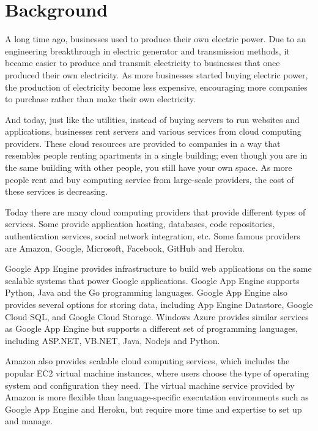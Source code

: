 
\section{Background}

A long time ago, businesses used to produce their own electric power.  Due to an engineering breakthrough in electric generator and transmission methods, it became easier to produce and transmit electricity to businesses that once produced their own electricity. As more businesses started buying electric power, the production of electricity become less expensive, encouraging more companies to purchase rather than make their own electricity.

And today, just like the utilities, instead of buying servers to run websites and applications, businesses rent servers and various services from cloud computing providers. These cloud resources are provided to companies in a way that resembles people renting apartments in a single building; even though you are in the same building with other people, you still have your own space. As more people rent and buy computing service from large-scale providers, the cost of these services is decreasing. 

Today there are many cloud computing providers that provide different types of services. Some provide application hosting, databases, code repositories, authentication services, social network integration, etc.  Some famous providers are Amazon, Google, Microsoft, Facebook, GitHub and Heroku. 

Google App Engine provides infrastructure to build web applications on the same scalable systems that power Google applications.  Google App Engine supports Python, Java and the Go programming languages. Google App Engine also provides several options for storing data, including App Engine Datastore, Google Cloud SQL, and Google Cloud Storage. Windows Azure provides similar services as Google App Engine but supports a different set of programming languages, including ASP.NET, VB.NET, Java, Nodejs and Python.

Amazon also provides scalable cloud computing services, which includes the popular EC2 virtual machine instances, where users choose the type of operating system and configuration they need. The virtual machine service provided by Amazon is more flexible than language-specific executation environments such as Google App Engine and Heroku, but require more time and expertise to set up and manage. 

